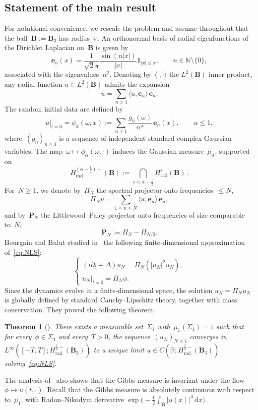 \documentclass[11pt,reqno,english]{amsart}
\numberwithin{equation}{section}
\theoremstyle{plain}
\newtheorem{theorem}{Theorem}[section]
\theoremstyle{definition}
\theoremstyle{remark}
\newcommand{\R}{\mathbb{R}}
\newcommand{\N}{\mathbb{N}}
\begin{document}
\subsection{Statement of the main result}
For notational convenience, we rescale the problem and assume throughout that the ball~$\mathbf{B}:=\mathbf{B}_{3}$ has radius~$\pi$. An orthonormal basis of radial eigenfunctions of the Dirichlet Laplacian on~$\mathbf{B}$ is given by
\begin{equation}
	\label{eq:en}
	\mathbf{e}_{n}(x)
	= \frac{1}{\sqrt{2}\pi}\frac{\sin(n|x|)}{|x|}\mathbf{1}_{|x|\leq \pi},
	\qquad n\in\N\setminus\{0\},
\end{equation}
associated with the eigenvalues~$n^{2}$.
Denoting by~$\langle\cdot,\cdot\rangle$ the $L^{2}(\mathbf{B})$ inner product, any radial function
$u\in L^{2}(\mathbf{B})$ admits the expansion
\[
u=\sum_{n\geq1}\langle u,\mathbf{e}_{n}\rangle\,\mathbf{e}_{n}.
\]
The random initial data are defined by
\begin{equation}\label{eq:initial_data}
	u|_{t=0}
	=
	\phi_{\alpha}(\omega,x):=\sum_{n\geq1}\frac{g_{n}(\omega)}{n^{\alpha}}\,\mathbf{e}_{n}(x),
	\qquad \alpha\leq 1,
\end{equation}
where~$(g_{n})_{n\geq1}$ is a sequence of independent standard complex Gaussian variables.
The map~$\omega\mapsto \phi_\alpha(\omega,\cdot)$ induces the Gaussian measure~$\mu_\alpha$, supported on
\[
H_\mathrm{rad}^{(\alpha-\frac{1}{2})-}(\mathbf{B}):=\bigcap_{s<\alpha-\frac{1}{2}}H_\mathrm{rad}^{s}(\mathbf{B})\,.
\]
For~$N\geq1$, we denote by~$\Pi_{N}$ the spectral projector onto frequencies~$\leq N$,
\[
\Pi_{N}u
= \sum_{1\leq n\leq N}\langle u,\mathbf{e}_{n}\rangle\,\mathbf{e}_{n},
\]
and by~$\mathbf{P}_{N}$ the Littlewood--Paley projector onto frequencies of size comparable to~$N$,
\[
\mathbf{P}_{N}:=\Pi_{N}-\Pi_{N/2}.
\]
Bourgain and Bulut studied in~\cite{BB14} the following finite-dimensional approximation of~\eqref{eq:NLS}:
\begin{equation}
	\label{eq:BB}
	\begin{cases}
		(i\partial_{t}+\Delta)u_{N}
		= \Pi_{N}(|u_{N}|^{2}u_{N}),\\
		u_{N}|_{t=0}
		= \Pi_{N}\phi.
	\end{cases}
\end{equation}
Since the dynamics evolve in a finite-dimensional space, the solution
$u_{N}=\Pi_{N}u_{N}$ is globally defined by standard Cauchy--Lipschitz theory, together with mass conservation. They proved the following theorem.
\begin{theorem}[\cite{BB14}]
	\label{thm:BB}
	There exists a measurable set~$\Sigma_{1}$ with~$\mu_{1}(\Sigma_{1})=1$ such that
	for every~$\phi\in\Sigma_{1}$ and every~$T>0$, the sequence~$(u_{N})_{N\geq1}$ converges in
	$L^{\infty}([-T,T]; H_\mathrm{rad}^{\frac12-}(\mathbf{B}_{3}))$ to a unique limit
	$
	u\in C(\R;H_\mathrm{rad}^{\frac12-}(\mathbf{B}_{3}))
	$
	solving~\eqref{eq:NLS}.
\end{theorem}
The analysis of~\cite{BB14} also shows that the Gibbs measure is invariant under the flow~$\phi\mapsto u(t,\cdot)$. Recall that the Gibbs measure is absolutely continuous with respect to~$\mu_1$, with Radon--Nikodym derivative
$
\exp\big(-\frac12\int_{\mathbf{B}}|u(x)|^{4}\,\mathrm{d}x\big).
$
\end{document}
